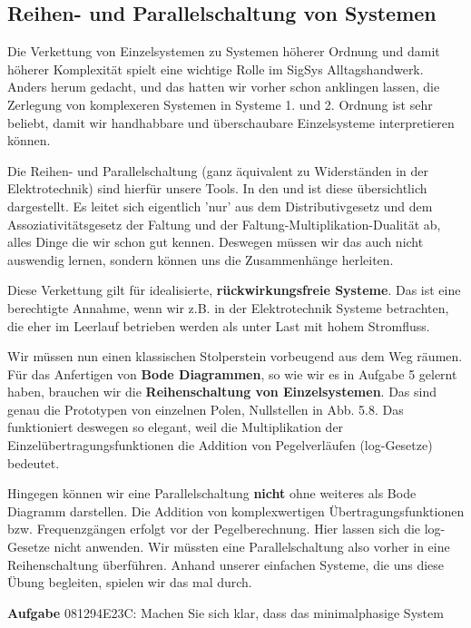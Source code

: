 \subsection{Reihen- und Parallelschaltung von Systemen}
\label{sec:081294E23C}
\begin{Ziel}
Die Verkettung von Einzelsystemen zu Systemen höherer Ordnung und damit
höherer Komplexität spielt eine wichtige Rolle im SigSys Alltagshandwerk.
Anders herum gedacht, und das hatten wir vorher schon anklingen lassen, die
Zerlegung von komplexeren Systemen in Systeme 1. und 2. Ordnung ist
sehr beliebt, damit wir handhabbare und überschaubare Einzelsysteme interpretieren
können.

Die Reihen- und Parallelschaltung (ganz äquivalent zu Widerständen in der Elektrotechnik)
sind hierfür unsere Tools.
In den  und 
ist diese übersichtlich dargestellt. Es leitet sich eigentlich 'nur' aus dem
Distributivgesetz und dem Assoziativitätsgesetz der Faltung und der
Faltung-Multiplikation-Dualität ab, alles Dinge die wir schon gut kennen.
Deswegen müssen wir das auch nicht auswendig lernen, sondern können uns
die Zusammenhänge herleiten.

Diese Verkettung gilt für idealisierte, \textbf{rückwirkungsfreie Systeme}.
Das ist eine berechtigte Annahme, wenn wir z.B. in der Elektrotechnik Systeme
betrachten, die eher im Leerlauf betrieben werden als unter Last mit hohem Stromfluss.


Wir müssen nun einen klassischen Stolperstein vorbeugend aus dem Weg räumen.
Für das Anfertigen von \textbf{Bode Diagrammen}, so wie wir es in Aufgabe 5 gelernt haben,
brauchen wir die \textbf{Reihenschaltung von Einzelsystemen}. Das sind
genau die Prototypen von einzelnen Polen, Nullstellen in Abb. 5.8.
Das funktioniert deswegen so elegant, weil die Multiplikation der
Einzelübertragungsfunktionen die Addition von Pegelverläufen (log-Gesetze)
bedeutet.

Hingegen können wir eine Parallelschaltung \textbf{nicht} ohne weiteres
als Bode Diagramm darstellen.
Die Addition von komplexwertigen Übertragungsfunktionen bzw. Frequenzgängen
erfolgt vor der Pegelberechnung. Hier lassen sich die log-Gesetze nicht anwenden.
Wir müssten eine Parallelschaltung also vorher in eine Reihenschaltung überführen.
%
Anhand unserer einfachen Systeme, die uns diese Übung begleiten, spielen wir das
mal durch.

\end{Ziel}
\textbf{Aufgabe} {\tiny 081294E23C}: Machen Sie sich klar, dass das minimalphasige System
